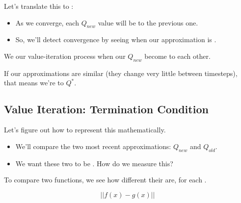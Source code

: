         Let's translate this to :

        \begin{itemize}
            \item As we converge, each $Q_{new}$ value will be  to the previous one.

            \item So, we'll detect convergence by seeing when our approximation is .\\
        \end{itemize}

        \begin{concept}
            We  our value-iteration process when our  $Q_{new}$ become  to each other.

            If our approximations are similar (they change very little between timesteps), that means we're  to $Q^*$.
         \end{concept}




    \pagebreak

    \subsection{Value Iteration: Termination Condition}

         Let's figure out how to represent this mathematically.

         \begin{itemize}
             \item We'll compare the two most recent approximations: $Q_{new}$ and $Q_{old}$.
             \item We want these two  to be . How do we measure this?\\
         \end{itemize}

         \begin{concept}
                 To compare two functions, we see how different their  are, for each .

                 \begin{equation*}
                     \Big|\Big|
                        f(x) - g(x)
                     \Big|\Big|
                 \end{equation*}
             \end{concept}

